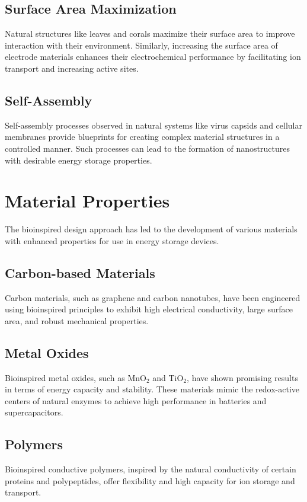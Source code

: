 \documentclass[12pt]{article}
\begin{document}
\subsection{Surface Area Maximization}
Natural structures like leaves and corals maximize their surface area to improve interaction with their environment. Similarly, increasing the surface area of electrode materials enhances their electrochemical performance by facilitating ion transport and increasing active sites.

\subsection{Self-Assembly}
Self-assembly processes observed in natural systems like virus capsids and cellular membranes provide blueprints for creating complex material structures in a controlled manner. Such processes can lead to the formation of nanostructures with desirable energy storage properties.

\section{Material Properties}
The bioinspired design approach has led to the development of various materials with enhanced properties for use in energy storage devices.

\subsection{Carbon-based Materials}
Carbon materials, such as graphene and carbon nanotubes, have been engineered using bioinspired principles to exhibit high electrical conductivity, large surface area, and robust mechanical properties\cite{bioinspiredGraphene}.

\subsection{Metal Oxides}
Bioinspired metal oxides, such as MnO$_2$ and TiO$_2$, have shown promising results in terms of energy capacity and stability. These materials mimic the redox-active centers of natural enzymes to achieve high performance in batteries and supercapacitors\cite{bioinspiredMetalOxides}.

\subsection{Polymers}
Bioinspired conductive polymers, inspired by the natural conductivity of certain proteins and polypeptides, offer flexibility and high capacity for ion storage and transport.
\end{document}
